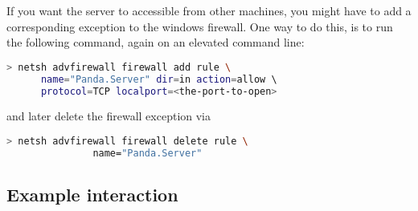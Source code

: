 \documentclass[a4paper,12pt]{article}
\begin{document}
If you want the server to accessible from other machines, you might have to add a corresponding exception to the windows firewall.
One way to do this, is to run the following command, again on an elevated command line:
\begin{lstlisting}[language=bash]
> netsh advfirewall firewall add rule \ 
      name="Panda.Server" dir=in action=allow \ 
      protocol=TCP localport=<the-port-to-open>
\end{lstlisting}
and later delete the firewall exception via
\begin{lstlisting}[language=bash]
> netsh advfirewall firewall delete rule \
               name="Panda.Server"
\end{lstlisting}

\subsection{Example interaction}
\end{document}
